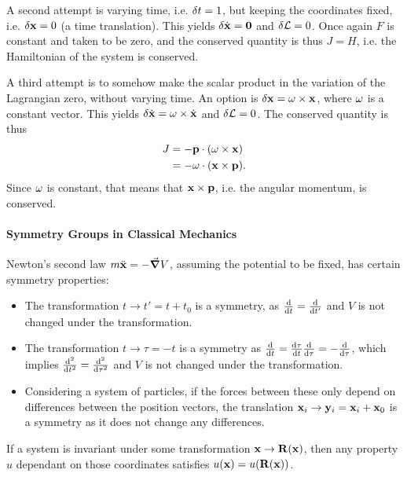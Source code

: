 A second attempt is varying time, i.e. $\var{t} = 1$, but keeping the coordinates fixed, i.e. $\var{\vb{x}} = 0$ (a time translation). This yields $\var{\dot{\vb{x}}} = \vb{0}$ and $\var{\ensuremath{\mathcal{L}}} = 0$. Once again $F$ is constant and taken to be zero, and the conserved quantity is thus $J = H$, i.e. the Hamiltonian of the system is conserved.

A third attempt is to somehow make the scalar product in the variation of the Lagrangian zero, without varying time. An option is $\var{\vb{x}} = \vb{\omega}\times\vb{x}$, where $\vb{\omega}$ is a constant vector. This yields $\var{\dot{\vb{x}}} = \vb{\omega}\times\dot{\vb{x}}$ and $\var{\ensuremath{\mathcal{L}}} = 0$. The conserved quantity is thus
\begin{align*}
J &= -\vb{p}\cdot(\vb{\omega}\times\vb{x}) \\
&= -\vb{\omega}\cdot(\vb{x}\times\vb{p}).
\end{align*}
Since $\vb{\omega}$ is constant, that means that $\vb{x}\times\vb{p}$, i.e. the angular momentum, is conserved.

\paragraph{Symmetry Groups in Classical Mechanics}

Newton's second law $m\ddot{\vb{x}} = -\grad{V}$, assuming the potential to be fixed, has certain symmetry properties:
\begin{itemize}
	\item The transformation $t\to t' = t + t_{0}$ is a symmetry, as $\dv{t} = \dv{t'}$ and $V$ is not changed under the transformation.
	\item The transformation $t\to\tau = -t$ is a symmetry as $\dv{t} = \dv{\tau}{t}\dv{\tau} = -\dv{\tau}$, which implies $\dv[2]{t} = \dv[2]{\tau}$ and $V$ is not changed under the transformation.
	\item Considering a system of particles, if the forces between these only depend on differences between the position vectors, the translation $\vb{x}_{i}\to\vb{y}_{i} = \vb{x}_{i} + \vb{x}_{0}$ is a symmetry as it does not change any differences.
\end{itemize}

If a system is invariant under some transformation $\vb{x}\to\vb{R}(\vb{x})$, then any property $u$ dependant on those coordinates satisfies $u(\vb{x}) = u(\vb{R}(\vb{x}))$.

